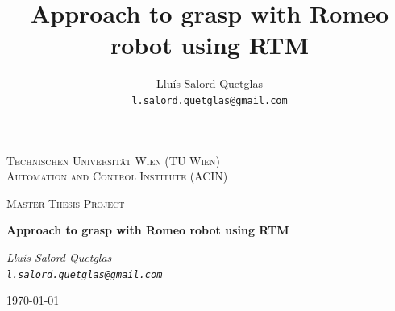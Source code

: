 \documentclass[12pt,a4paper,final,twoside,openright]{report}
\title{Approach to grasp with Romeo robot using RTM}
\author{Lluís Salord Quetglas\\
		\texttt{l.salord.quetglas@gmail.com}\\}
\date{Technischen Universität Wien (TU Wien)\\
Automation and Control Institute (ACIN)\\
\paragraph{} 
Master Thesis Project\\
\paragraph{}
\today} %
\begin{document}

\begin{titlepage}
	\centering
	{\scshape\LARGE Technischen Universität Wien (TU Wien)\\
Automation and Control Institute (ACIN) \par}
	\vspace{1cm}
	{\scshape\Large Master Thesis Project\par}
	\vspace{1.5cm}
	{\huge\bfseries Approach to grasp with Romeo robot using RTM\par}
	\vspace{2cm}
	{\Large\itshape Lluís Salord Quetglas\\
		\texttt{l.salord.quetglas@gmail.com}\par}

	\vfill

	{\large \today\par}
\end{titlepage}

\thispagestyle{empty}

\cleardoublepage

\end{document}
